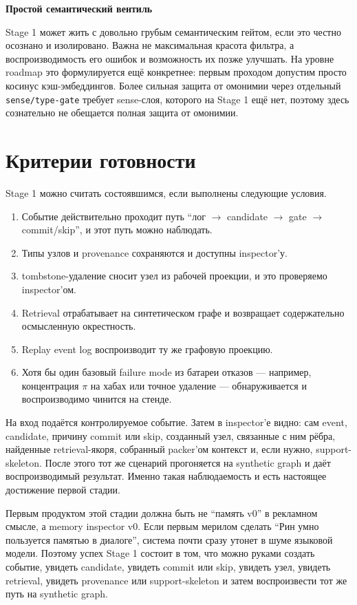 \textbf{Простой семантический вентиль}

Stage 1 может жить с довольно грубым семантическим гейтом, если это честно
осознано и изолировано. Важна не максимальная красота фильтра, а
воспроизводимость его ошибок и возможность их позже улучшать. На уровне
roadmap это формулируется ещё конкретнее: первым проходом допустим просто
косинус кэш-эмбеддингов. Более сильная защита от омонимии через отдельный
\texttt{sense/type-gate} требует sense-слоя, которого на Stage 1 ещё нет,
поэтому здесь сознательно не обещается полная защита от омонимии.

\section{Критерии готовности}

Stage 1 можно считать состоявшимся, если выполнены следующие условия.

\begin{enumerate}\itemsep2pt
\item Событие действительно проходит путь ``лог $\to$ candidate $\to$ gate
$\to$ commit/skip'', и этот путь можно наблюдать.
\item Типы узлов и provenance сохраняются и доступны inspector'у.
\item tombstone-удаление сносит узел из рабочей проекции, и это проверяемо
inspector'ом.
\item Retrieval отрабатывает на синтетическом графе и возвращает
содержательно осмысленную окрестность.
\item Replay event log воспроизводит ту же графовую проекцию.
\item Хотя бы один базовый failure mode из батареи отказов --- например,
концентрация $\pi$ на хабах или точное удаление --- обнаруживается и
воспроизводимо чинится на стенде.
\end{enumerate}

\begin{intuition}
На вход подаётся контролируемое событие. Затем в inspector'е видно: сам
event, candidate, причину commit или skip, созданный узел, связанные с ним
рёбра, найденные retrieval-якоря, собранный packer'ом контекст и, если нужно,
support-skeleton. После этого тот же сценарий прогоняется на synthetic graph и
даёт воспроизводимый результат. Именно такая наблюдаемость и есть настоящее
достижение первой стадии.
\end{intuition}

\begin{principle}
Первым продуктом этой стадии должна быть не ``память v0'' в рекламном
смысле, а memory inspector v0. Если первым мерилом сделать ``Рин умно
пользуется памятью в диалоге'', система почти сразу утонет в шуме языковой
модели. Поэтому успех Stage 1 состоит в том, что можно руками создать
событие, увидеть candidate, увидеть commit или skip, увидеть узел, увидеть
retrieval, увидеть provenance или support-skeleton и затем воспроизвести тот
же путь на synthetic graph.
\end{principle}

